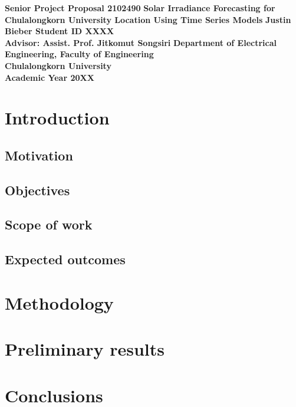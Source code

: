 \documentclass[11pt,a4paper]{article}
\begin{document}
\thispagestyle{empty}
\begin{center}
\doublespacing
{\Large \bf Senior Project Proposal 2102490}
\vfill
{
\Large \bf
Solar Irradiance Forecasting for Chulalongkorn University Location Using Time Series Models
}
\vfill
{\Large \bf Justin Bieber Student ID XXXX} \\[2ex]
{\Large \bf Advisor: Assist. Prof. Jitkomut Songsiri}
\vfill
{\Large \bf Department of Electrical Engineering, Faculty of Engineering} \\[2ex]
{\Large \bf Chulalongkorn University} \\[2ex]
{\Large \bf Academic Year 20XX}
\end{center}

\newpage
\thispagestyle{empty}
\tableofcontents

\newpage
\setcounter{page}{1}
\section{Introduction}

\subsection{Motivation}

\subsection{Objectives}

\subsection{Scope of work}

\subsection{Expected outcomes}

\section{Methodology}

\section{Preliminary results}

\section{Conclusions}
\end{document}
